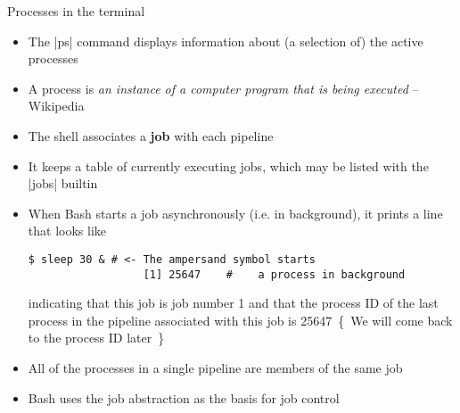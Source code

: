 
\begin{frame}[fragile]{Processes in the terminal}{}
    \vspace{-3mm}
    \begin{itemize}
        \item The \bash|ps| command displays information about (a selection of) the active processes
        \item A process is \emph{\guillemotleft an instance of a computer program that is being executed\guillemotright} -- Wikipedia
        \item The shell associates a \textbf{job} with each pipeline
        \item It keeps a table of currently executing jobs, which may be listed with the \bash|jobs| builtin
        \item When Bash starts a job asynchronously (i.e. in background), it prints a line that looks like
              \begin{lstlisting}[style=MyBash, numbers=none, aboveskip=2mm, belowskip=-5mm, xrightmargin=25mm]
                  $ sleep 30 & # <- The ampersand symbol starts
                  [1] 25647    #    a process in background
              \end{lstlisting}
              indicating that this job is job number 1 and that the process ID of the last process in the pipeline associated with this job is 25647
              \,{\tiny\{~We will come back to the process ID later~\}}
        \item All of the processes in a single pipeline are members of the same job
        \item Bash uses the job abstraction as the basis for job control
    \end{itemize}
\end{frame}
